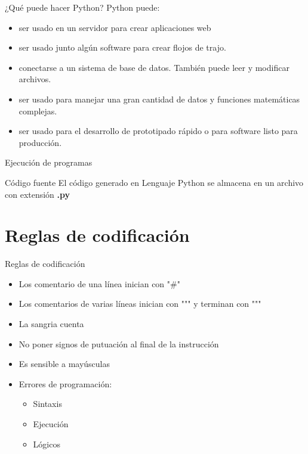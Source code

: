 \begin{frame}[c]{¿Qué puede hacer Python?}
  Python puede:
  \begin{itemize}
    \item ser usado en un servidor para crear aplicaciones web
    \item ser usado junto algún software para crear flojos de trajo.
    \item conectarse a un sistema de base de datos. También puede leer y
          modificar archivos.
    \item ser usado para manejar una gran cantidad de datos y funciones
          matemáticas complejas.
    \item ser usado para el desarrollo de prototipado rápido o para software
          listo para producción.
  \end{itemize}
\end{frame}

\begin{frame}[c]{Ejecución de programas}
  \begin{block}{Código fuente}
    El código generado en Lenguaje Python se almacena en un archivo con
    extensión \textbf{.py}
  \end{block}
\end{frame}

\section{Reglas de codificación}

\begin{frame}[c]{Reglas de codificación}
  \begin{itemize}
    \item Los comentario de una línea inician con "\#"
    \item Los comentarios de varias líneas inician con """ y terminan con """
    \item La sangria cuenta
    \item No poner signos de putuación al final de la instrucción
    \item Es sensible a mayúsculas
    \item Errores de programación:
          \begin{itemize}
            \item Sintaxis
            \item Ejecución
            \item Lógicos
          \end{itemize}
  \end{itemize}
\end{frame}

